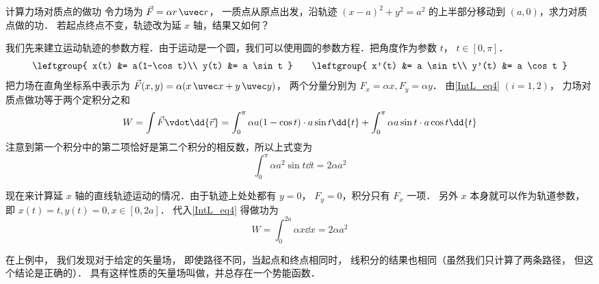 \begin{exam}{计算力场对质点的做功}\label{IntL_ex1}
令力场为 $\vec F = \alpha r \,\uvec r$， 一质点从原点出发，沿轨迹 $(x-a)^2 + y^2 = a^2$ 的上半部分移动到 $(a,0)$，求力对质点做的功． 若起点终点不变，轨迹改为延 $x$ 轴，结果又如何？

我们先来建立运动轨迹的参数方程．由于运动是一个圆，我们可以使用圆的参数方程．把角度作为参数 $t$， $t\in [0,\pi]$．
\begin{equation}
\leftgroup{
x(t) &= a(1-\cos t)\\
y(t) &= a \sin t
}
\qquad 
\leftgroup{
x'(t) &= a \sin t\\
y'(t) &= a \cos t
}
\end{equation}
把力场在直角坐标系中表示为 $\vec F(x,y) = \alpha (x\,\uvec x + y\,\uvec y)$， 两个分量分别为 $F_x = \alpha x, F_y = \alpha y$． 由\autoref{IntL_eq4} $(i=1,2)$， 力场对质点做功等于两个定积分之和
\begin{equation}
W = \int \vec F \vdot \dd{\vec r} =\int_0^\pi \alpha a(1-\cos t) \cdot a \sin t \dd{t} + \int_0^\pi \alpha a \sin t \cdot a \cos t \dd{t}
\end{equation}
注意到第一个积分中的第二项恰好是第二个积分的相反数，所以上式变为
\begin{equation}
\int_0^\pi \alpha a^2 \sin t \dd{t} =2 \alpha a^2
\end{equation}

现在来计算延 $x$ 轴的直线轨迹运动的情况．由于轨迹上处处都有 $y=0$， $F_y = 0$，积分只有 $F_x$ 一项． 另外 $x$ 本身就可以作为轨道参数，即 $x(t) = t, y(t) = 0, x\in [0, 2a]$． 代入\autoref{IntL_eq4} 得做功为
\begin{equation}
W = \int_0^{2a} \alpha x \dd{x} = 2 \alpha a^2
\end{equation}
\end{exam}

在上例中， 我们发现对于给定的矢量场， 即使路径不同，当起点和终点相同时， 线积分的结果也相同（虽然我们只计算了两条路径， 但这个结论是正确的）． 具有这样性质的矢量场叫做，并总存在一个势能函数． 





